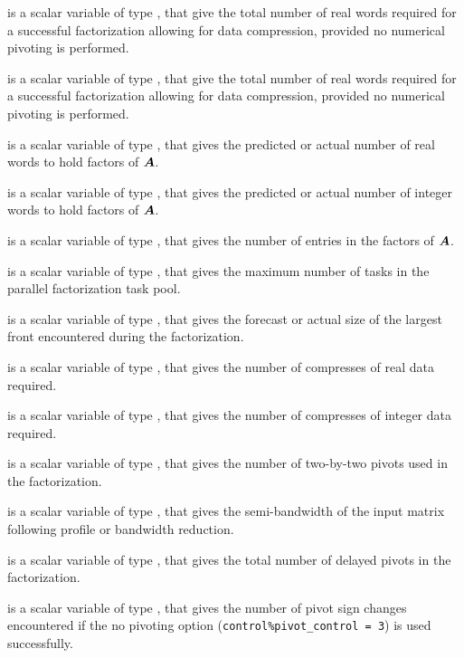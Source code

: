 \documentclass{galahad}
\begin{document}
\begin{description}
 is a scalar variable of type \longinteger,
that give the total number of real words required for a
successful factorization allowing for data compression,
provided no numerical pivoting is performed.

 is a scalar variable of type \longinteger,
that give the total number of real words required for a
successful factorization allowing for data compression,
provided no numerical pivoting is performed.

 is a scalar variable of type \longinteger,
that gives the predicted or actual number of real words to hold factors
of ${\bm{A}}$.

 is a scalar variable of type \longinteger,
that gives the predicted or actual number of integer words to hold factors
of ${\bm{A}}$.

 is a scalar variable of type \longinteger,
that gives the number of entries in the factors of ${\bm{A}}$.

 is a scalar variable of type \integer,
that gives the maximum number of tasks in the parallel factorization task pool.

 is a scalar variable of type \integer,
that gives the forecast or actual size of the largest front encountered
during the factorization.

 is a scalar variable of type \integer,
that gives the number of compresses of real data required.

 is a scalar variable of type \integer,
that gives the number of compresses of integer data required.

 is a scalar variable of type \integer,
that gives the number of two-by-two pivots used in the factorization.

 is a scalar variable of type \integer,
that gives the semi-bandwidth of the input matrix following
profile or bandwidth reduction.

 is a scalar variable of type \integer,
that gives the total number of delayed pivots in the factorization.

 is a scalar variable of type \integer,
that gives the number of pivot sign changes encountered if the no pivoting
option ({\tt control\%pivot\_control = 3}) is used successfully.


\end{description}
\end{document}
